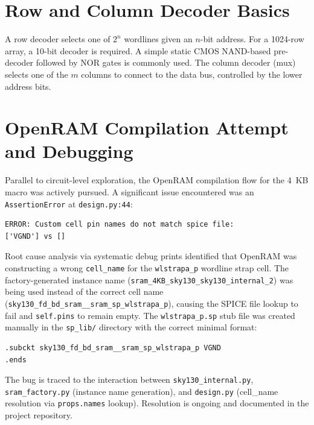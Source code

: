 \documentclass[conference]{IEEEtran}
\begin{document}
\section{Row and Column Decoder Basics}
A row decoder selects one of $2^n$ wordlines given an $n$-bit address. For a 1024-row array, a 10-bit decoder is required. A simple static CMOS NAND-based pre-decoder followed by NOR gates is commonly used. The column decoder (mux) selects one of the $m$ columns to connect to the data bus, controlled by the lower address bits.

\section{OpenRAM Compilation Attempt and Debugging}

Parallel to circuit-level exploration, the OpenRAM compilation flow for the 4~KB macro was actively pursued. A significant issue encountered was an \texttt{AssertionError} at \texttt{design.py:44}:

\begin{lstlisting}
ERROR: Custom cell pin names do not match spice file:
['VGND'] vs []
\end{lstlisting}

Root cause analysis via systematic debug prints identified that OpenRAM was constructing a wrong \texttt{cell\_name} for the \texttt{wlstrapa\_p} wordline strap cell. The factory-generated instance name (\texttt{sram\_4KB\_sky130\_sky130\_internal\_2}) was being used instead of the correct cell name (\texttt{sky130\_fd\_bd\_sram\_\_sram\_sp\_wlstrapa\_p}), causing the SPICE file lookup to fail and \texttt{self.pins} to remain empty. The \texttt{wlstrapa\_p.sp} stub file was created manually in the \texttt{sp\_lib/} directory with the correct minimal format:

\begin{lstlisting}
.subckt sky130_fd_bd_sram__sram_sp_wlstrapa_p VGND
.ends
\end{lstlisting}

The bug is traced to the interaction between \texttt{sky130\_internal.py}, \texttt{sram\_factory.py} (instance name generation), and \texttt{design.py} (cell\_name resolution via \texttt{props.names} lookup). Resolution is ongoing and documented in the project repository.
\end{document}
